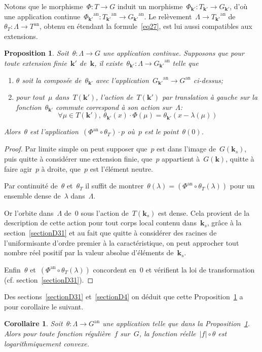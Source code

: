 \documentclass[french]{amsart}
\newcommand{\kk}{\mathbf{k}}
\newcommand{\abs}[1]{{\left|{#1}\right|}}
\newcommand{\an}{\textrm{an}}
\newtheorem{proposition}{Proposition}[section]
\newtheorem{corollaire}{Corollaire}[section]
\begin{document}
Notons que le morphisme~$\Phi:T\to G$ induit un morphisme~$\Phi_{\kk'}:T_{\kk'}\to G_{\kk'}$, d'où une application continue~${\Phi_{\kk'}}^\an:{T_{\kk'}}^\an\to {G_{\kk'}}^\an$. Le relèvement~$\Lambda\to{T_{\kk'  }}^\an$ de~$\theta_T:\Lambda\to T^\an$, obtenu en étendant la formule~\eqref{eq27}, est lui aussi compatibles aux extensions.
\begin{proposition} \label{propD1}\label{PropD1}
Soit~$\theta:\Lambda\to G$ une application continue. Supposons que pour toute extension finie~$\kk'$ de~$\kk$, il existe~$\theta_{\kk'}:\Lambda\to {G_{\kk'}}^\an$ telle que
\begin{enumerate}[label=\alph*.]
\item \label{D11} $\theta$ soit la composée de~$\theta_{\kk'}$ avec l'application~${G_{\kk'}}^\an\to G^\an$ ci-dessus;
\item \label{D12}	pour tout~$\mu$ dans~$T(\kk')$, l'action de~$T(\kk')$ par translation à gauche sur la fonction~$\theta_{\kk'}$ commute correspond à son action sur~$\Lambda$:
\begin{equation}
\forall\mu\in T(\kk'),~\theta_{\kk'}(x)\cdot\Phi(\mu)=\theta_{\kk'}(x-\lambda(\mu))
\end{equation}
\end{enumerate}
Alors~$\theta$ est l'application~$(\Phi^\an\circ\theta_T)\cdot p$ où~$p$ est le point~$\theta(0)$. 
\end{proposition}
\begin{proof}
Par limite simple on peut supposer que~$p$ est dans l'image
de~$G(\kk_s)$, puis quitte à considérer une extension finie, que~$p$ appartient à~$G(\kk)$, quitte à faire agir~$p$ à droite, que~$p$ est l'élément neutre.

Par continuité de~$\theta$ et~$\theta_T$ il suffit de montrer~$\theta(\lambda) = (\Phi^\an\circ\theta_T (\lambda))$ pour un ensemble
dense de~$\lambda$ dans~$\Lambda$.

Or l'orbite dans~$\Lambda$ de~$0$ sous l'action de~$T (\kk_s)$ est dense.
Cela provient de la description de cette action pour tout corps local contenu dans~$\kk_s$, grâce à la section~\ref{sectionD31} et au fait que quitte à considérer des racines de l'uniformisante d'ordre premier à la caractéristique, on peut approcher tout nombre réel positif par la valeur absolue d'éléments de~$\kk_s$.

Enfin~$\theta$ et~$(\Phi^\an \circ \theta_T (\lambda))$ concordent en~$0$ et vérifient la loi de transformation (cf. section~\ref{sectionD31}).
\end{proof}
Des sections~\ref{sectionD31} et~\ref{sectionD4} on déduit que cette Proposition~\ref{propD1} a pour corollaire le suivant.
\begin{corollaire}\label{coroD2}
Soit~$\theta:\Lambda\to G^\an$ une application telle que dans la Proposition~\ref{propD1}. Alors pour toute fonction régulière~$f$ sur~$G$, la fonction réelle~$\abs{f}\circ\theta$ est logarithmiquement convexe.
\end{corollaire}
\end{document}
